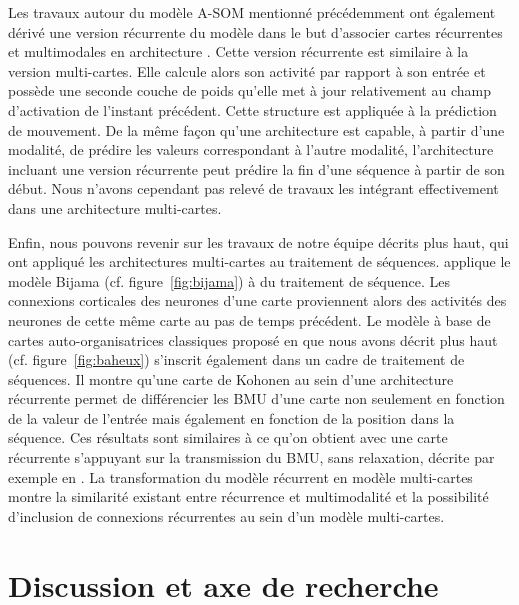 \documentclass[../main]{subfiles}
\begin{document}
Les travaux autour du modèle A-SOM mentionné précédemment ont également dérivé une version récurrente du modèle dans le but d'associer cartes récurrentes et multimodales en architecture \parencite{Buonamente2015DiscriminatingAS}.
Cette version récurrente est similaire à la version multi-cartes. Elle calcule alors son activité par rapport à son entrée et possède une seconde couche de poids qu'elle met à jour relativement au champ d'activation de l'instant précédent.
Cette structure est appliquée à la prédiction de mouvement. De la même façon qu'une architecture est capable, à partir d'une modalité, de prédire les valeurs correspondant à l'autre modalité, l'architecture incluant une version récurrente peut prédire la fin d'une séquence à partir de son début.
Nous n'avons cependant pas relevé de travaux les intégrant effectivement dans une architecture multi-cartes.

Enfin, nous pouvons revenir sur les travaux de notre équipe décrits plus haut, qui ont appliqué les architectures multi-cartes au traitement de séquences.
\cite{khouzam_neural_2014} applique le modèle Bijama (cf. figure~\ref{fig:bijama}) à du traitement de séquence. Les connexions corticales des neurones d'une carte proviennent alors des activités des neurones de cette même carte au pas de temps précédent.
Le modèle à base de cartes auto-organisatrices classiques proposé en \cite{baheux_towards_2014} que nous avons décrit plus haut (cf. figure~\ref{fig:baheux}) s'inscrit également dans un cadre de traitement de séquences. 
Il montre qu'une carte de Kohonen au sein d'une architecture récurrente permet de différencier les BMU d'une carte non seulement en fonction de la valeur de l'entrée mais également en fonction de la position dans la séquence. Ces résultats sont similaires à ce qu'on obtient avec une carte récurrente s'appuyant sur la transmission du BMU, sans relaxation, décrite par exemple en \cite{fix20}. La transformation du modèle récurrent en modèle multi-cartes montre la similarité existant entre récurrence et multimodalité et la possibilité d'inclusion de connexions récurrentes au sein d'un modèle multi-cartes.





\section{Discussion et axe de recherche}
\end{document}
